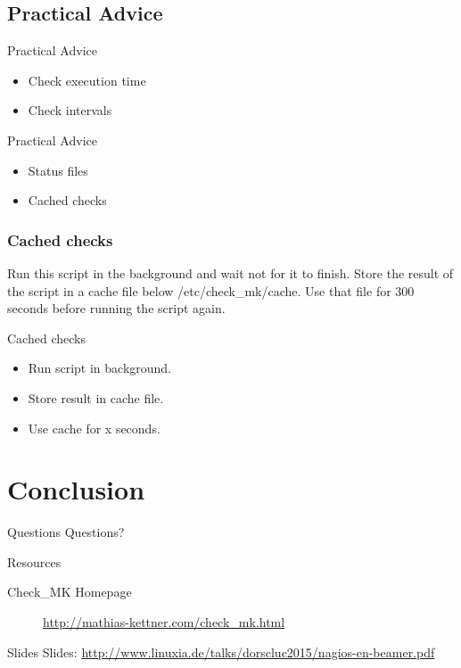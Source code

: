 \subsection{Practical Advice}
\begin{frame}{Practical Advice}
\begin{itemize}
\item Check execution time
\item Check intervals
\end{itemize}
\end{frame}

\begin{frame}{Practical Advice}
\begin{itemize}
\item Status files
\item Cached checks
\end{itemize}
\end{frame}

\subsubsection{Cached checks}

Run this script in the background and wait not for it to finish.
Store the result of the script in a cache file below /etc/check\_mk/cache.
Use that file for 300 seconds before running the script again.

\begin{frame}{Cached checks}
\begin{itemize}
\item Run script in background.
\item Store result in cache file.
\item Use cache for x seconds.
\end{itemize}
\end{frame}

\section{Conclusion}

\begin{frame}{Questions}
Questions?
\end{frame}

\begin{frame}[fragile]{Resources}
\begin{description}
\item[Check\_MK Homepage] \url{http://mathias-kettner.com/check_mk.html}
\end{description}
\end{frame}

\begin{frame}{Slides}
Slides:
\url{http://www.linuxia.de/talks/dorscluc2015/nagios-en-beamer.pdf}
\end{frame}




